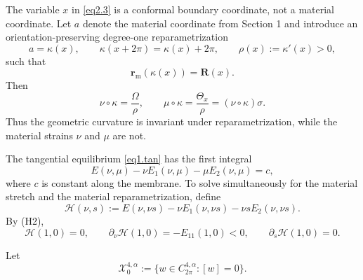 \documentclass[12pt]{article}
\numberwithin{equation}{section}
\numberwithin{equation}{section}
\begin{document}
The variable $x$ in \eqref{eq2.3} is a conformal boundary coordinate, not a material
coordinate.  Let $a$ denote the material coordinate from Section 1 and introduce an
orientation-preserving degree-one reparametrization
\begin{equation}\label{eq2.kappa}
a=\kappa(x),\qquad
\kappa(x+2\pi)=\kappa(x)+2\pi,\qquad
\rho(x):=\kappa'(x)>0,
\end{equation}
such that
\[
\mathbf r_{\mathrm m}(\kappa(x))=\mathbf R(x).
\]
Then
\begin{equation}\label{eq2.strains}
\nu\circ\kappa=\frac{\Omega}{\rho},
\qquad
\mu\circ\kappa=\frac{\Theta_x}{\rho}
=\left(\nu\circ\kappa\right)\sigma.
\end{equation}
Thus the geometric curvature is invariant under reparametrization, while the material
strains $\nu$ and $\mu$ are not.

The tangential equilibrium \eqref{eq1.tan} has the first integral
\begin{equation}\label{eq2.firstintegral}
E(\nu,\mu)-\nu E_1(\nu,\mu)-\mu E_2(\nu,\mu)=c,
\end{equation}
where $c$ is constant along the membrane.  To solve simultaneously for the material
stretch and the material reparametrization, define
\begin{equation}\label{eq2.H}
\mathscr H(\nu,s)
:=
E(\nu,\nu s)-\nu E_1(\nu,\nu s)-\nu s E_2(\nu,\nu s).
\end{equation}
By (H2),
\[
\mathscr H(1,0)=0,\qquad
\partial_\nu\mathscr H(1,0)=-E_{11}(1,0)<0,
\qquad
\partial_s\mathscr H(1,0)=0.
\]

Let
\[
\mathcal X^{4,\alpha}_0
:=\{w\in C^{4,\alpha}_{2\pi}: [w]=0\}.
\]
\end{document}
